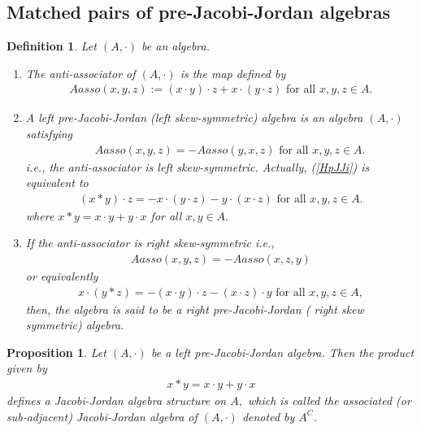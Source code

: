 \documentclass[12pt]{amsart}
\newtheorem{definition}[Theorem]{Definition}
\newtheorem{proposition}[Theorem]{Proposition}
\begin{document}
\subsection{Matched pairs of pre-Jacobi-Jordan algebras}
\begin{definition}
	Let $(A,\cdot)$ be an algebra.
	\begin{enumerate}
		\item  The anti-associator of $(A,\cdot)$ is the map defined by
		\begin{eqnarray}
			Aasso(x,y,z):=(x\cdot y)\cdot z+x\cdot(y\cdot z) 
			\mbox{ for all $x,y,z\in A.$} \label{antiHas}
		\end{eqnarray}
		\item A left pre-Jacobi-Jordan (left skew-symmetric) algebra  is an algebra $(A,\cdot)$ satisfying
		\begin{eqnarray}
			&& Aasso(x,y,z)=-Aasso(y,x,z) \mbox{ for all $x,y,z\in A.$} \label{HpJJi}
		\end{eqnarray}
		i.e., the anti-associator is left skew-symmetric. Actually, (\ref{HpJJi}) is equivalent to
		\begin{eqnarray}
			(x\ast y)\cdot z=-x\cdot(y\cdot z)-y\cdot(x\cdot z)
			\mbox{ for all $x,y,z\in A.$} \label{HpJJi2}
		\end{eqnarray}
		where $x\ast y=x\cdot y+y\cdot x$ for all 
		$x,y\in A.$
		\item If the anti-associator is right skew-symmetric i.e., 
		\begin{eqnarray}
			Aasso(x,y,z)=-Aasso(x,z,y)\label{HpJJir}
		\end{eqnarray}
		or equivalently
		\begin{eqnarray}
			x\cdot(y\ast z)=-(x\cdot y)\cdot z-(x\cdot z)\cdot y \mbox{ for all $x,y,z\in A,$}\nonumber
		\end{eqnarray}
		then, the algebra is said to be a right pre-Jacobi-Jordan ( right skew symmetric) algebra.	
	\end{enumerate}
\end{definition}
\begin{proposition}\label{lpHJJHJJ}
	Let $(A,\cdot)$ be a left  pre-Jacobi-Jordan  algebra. Then the product given by
	\begin{eqnarray}
		x\ast y=x\cdot y+y\cdot x \label{asHJJ}
	\end{eqnarray}
	defines a Jacobi-Jordan algebra structure on $A,$ which is called the associated (or sub-adjacent) Jacobi-Jordan algebra
	of $(A,\cdot)$ denoted by $A^C$.
\end{proposition}
\end{document}
